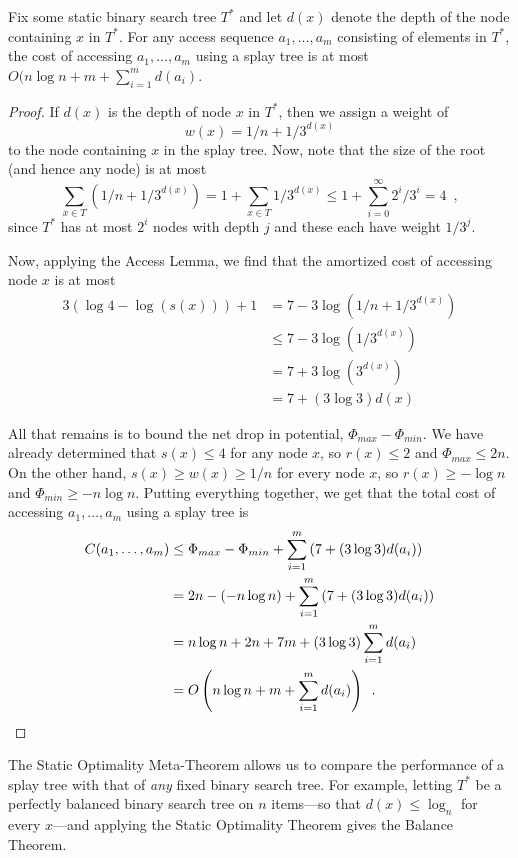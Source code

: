 {\begin{thm} 
Fix some static binary search tree $T^*$ and let $d(x)$ denote the depth
of the node containing $x$ in $T^*$. 
For any access sequence $a_1,\ldots,a_m$ consisting of elements in $T^*$,
the cost of accessing $a_1,\ldots,a_m$ using a splay tree is at most
$O(n\log n + m + \sum_{i=1}^m d(a_i)$.
\end{thm}

\begin{proof}
If $d(x)$ is the depth of node $x$ in $T^*$, then we assign a weight of
\[
   w(x)=1/n+1/3^{d(x)}
\]
to the node containing $x$ in the splay tree.  Now, note that the size of the root (and hence any node) is at most 
\[
    \sum_{x\in T}\left(1/n + 1/3^{d(x)}\right) = 
    1 + \sum_{x\in T}1/3^{d(x)} 
    \le 1 + \sum_{i=0}^\infty 2^i/3^i 
    = 4 \enspace ,
\]
since $T^*$ has at most $2^i$ nodes with depth $j$ and these each have
weight $1/3^j$. 

Now, applying the Access Lemma, we find that the amortized cost of
accessing node $x$ is at most
\begin{align*}
    3(\log 4 - \log(s(x))) + 1 
    & = 7 - 3\log(1/n+1/3^{d(x)})  \\
    & \le 7 - 3\log(1/3^{d(x)})   \\
    & = 7 + 3\log(3^{d(x)})   \\
    & = 7 + (3\log 3)d(x) 
\end{align*}

All that remains is to bound the net drop in potential, $\Phi_{max}-\Phi_{min}$.
We have already determined that $s(x)\le 4$ for any node $x$, so $r(x)\le 2$ and $\Phi_{max} \le 2n$.  On the other hand, $s(x)\ge w(x)\ge 1/n$ for every node $x$, so $r(x)\ge -\log n$ and $\Phi_{min}\ge -n\log n$.  Putting everything together, we get that the total cost of accessing $a_1,\ldots,a_m$
using a splay tree is
\begin{align*}
  C(a_1,\ldots,a_m) & \le
   \Phi_{max} - \Phi_{min} + \sum_{i=1}^m \left(7 + (3\log 3)d(a_i)\right) \\
  & = 2n - (-n\log n) + \sum_{i=1}^m \left(7 + (3\log 3)d(a_i)\right) \\
  & = n\log n + 2n + 7m + (3\log 3)\sum_{i=1}^m d(a_i) \\
  & = O\left(n\log n + m + \sum_{i=1}^m d(a_i)\right) \enspace .\qedhere
\end{align*}
\end{proof}

The Static Optimality Meta-Theorem allows us to compare the performance
of a splay tree with that of \emph{any} fixed binary search tree.
For example, letting $T^*$ be a perfectly balanced binary search tree
on $n$ items---so that $d(x)\le \log_n$ for every $x$---and applying
the Static Optimality Theorem gives the Balance Theorem.

}
